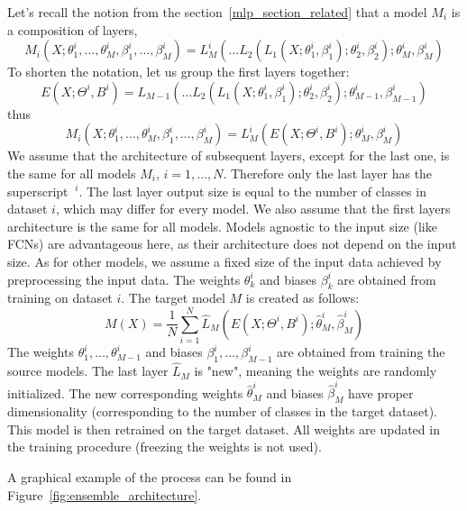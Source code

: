 \documentclass[a4paper,11pt,twoside]{report}
\theoremstyle{definition}
\begin{document}
Let's recall the notion from the section~\ref{mlp_section_related} that a model $M_i$ is a composition of layers, $$M_i(X; \theta_1^i,\dots , \theta_M^i, \beta_1^i,\dots , \beta_M^i) = L_M^i(\dots L_2(L_1(X;\theta_1^i, \beta_1^i);\theta_2^i, \beta_2^i);\theta_M^i, \beta_M^i)$$
To shorten the notation, let us group the first layers together:
$$E(X;\Theta^i, B^i) = L_{M-1}(\dots L_2(L_1(X;\theta_1^i, \beta_1^i);\theta_2^i, \beta_2^i);\theta_{M-1}^i, \beta_{M-1}^i)$$
thus
$$M_i(X; \theta_1^i,\dots , \theta_M^i, \beta_1^i,\dots , \beta_M^i) =  L_M^i(E(X; \Theta^i, B^i);\theta_M^i, \beta_M^i)$$
We assume that the architecture of subsequent layers, except for the last one, is the same for all models $M_i$, $i=1, \dots, N$. Therefore only the last layer has the superscript $\ ^i$. The last layer output size is equal to the number of classes in dataset $i$, which may differ for every model. We also assume that the first layers architecture is the same for all models. Models agnostic to the input size (like FCNs) are advantageous here, as their architecture does not depend on the input size. As for other models, we assume a fixed size of the input data achieved by preprocessing the input data.
The weights $\theta^i_k$ and biases $\beta^i_k$ are obtained from training on dataset $i$.
The target model $M$ is created as follows:
$$M(X) = \frac{1}{N} \sum_{i=1}^N \hat L_M( E(X; \Theta^i, B^i);\hat\theta_M^i, \hat\beta_M^i )$$
The weights $\theta_1^i, \dots, \theta_{M-1}^i$ and biases $\beta_1^i, \dots, \beta_{M-1}^i$ are obtained from training the source models. The last layer $\hat L_M$ is "new", meaning the weights are randomly initialized. The new corresponding weights $\hat\theta_M^i$ and biases $\hat\beta_M^i$ have proper dimensionality (corresponding to the number of classes in the target dataset). This model is then retrained on the target dataset. All weights are updated in the training procedure (freezing the weights is not used).

A graphical example of the process can be found in Figure~\ref{fig:ensemble_architecture}.
\end{document}
